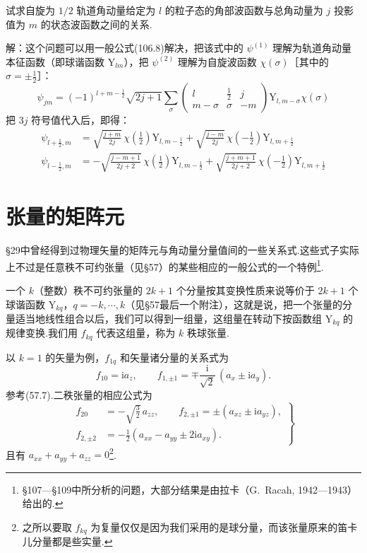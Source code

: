\begin{xiti}

\quad 试求自旋为 $1/2$ 轨道角动量给定为 $l$ 的粒子态的角部波函数与总角动量为 $j$ 投影值为 $m$ 的状态波函数之间的关系.

解：这个问题可以用一般公式(106.8)解决，把该式中的 $\psi^{(1)}$ 理解为轨道角动量本征函数（即球谐函数 $\mathrm{Y}_{lm}$），把 $\psi^{(2)}$ 理解为自旋波函数 $\chi(\sigma)$［其中的 $\sigma=\pm\frac12$］：
\begin{equation*}
  \psi_{jm}=(-1)^{l+m-\frac12}\sqrt{2j+1}\sum_\sigma
  \left(\begin{array}{ccc}l&\tfrac12&j\\m-\sigma&\sigma&-m\end{array}\right)
  \mathrm{Y}_{l,m-\sigma}\chi(\sigma)
\end{equation*}
把 $3j$ 符号值代入后，即得：
\begin{equation*}
\begin{aligned}
  \psi_{l+\frac12,m}&=\sqrt{\frac{j+m}{2j}}\,
  \chi\left(\tfrac12\right)\mathrm{Y}_{l,m-\frac12}
  +\sqrt{\frac{j-m}{2j}}\,
  \chi\left(-\tfrac12\right)\mathrm{Y}_{l,m+\frac12}\\
  \psi_{l-\frac12,m}&=-\sqrt{\frac{j-m+1}{2j+2}}\,
  \chi\left(\tfrac12\right)\mathrm{Y}_{l,m-\frac12}
  +\sqrt{\frac{j+m+1}{2j+2}}\,
  \chi\left(-\tfrac12\right)\mathrm{Y}_{l,m+\frac12}
\end{aligned}
\end{equation*}

\end{xiti}

\section{张量的矩阵元}

§29中曾经得到过物理矢量的矩阵元与角动量分量值间的一些关系式.这些式子实际上不过是任意秩不可约张量（见§57）的某些相应的一般公式的一个特例\footnote{§107—§109中所分析的问题，大部分结果是由拉卡（G.~Racah, 1942—1943）给出的.}.

一个 $k$（整数）秩不可约张量的 $2k+1$ 个分量按其变换性质来说等价于 $2k+1$ 个球谐函数 $\mathrm{Y}_{kq}$，$q=-k,\cdots,k$（见§57最后一个附注），这就是说，把一个张量的分量适当地线性组合以后，我们可以得到一组量，这组量在转动下按函数组 $\mathrm{Y}_{kq}$ 的规律变换.我们用 $f_{kq}$ 代表这组量，称为 $k$ 秩球张量.

以 $k=1$ 的矢量为例，$f_{1q}$ 和矢量诸分量的关系式为
\begin{equation}
  f_{10}=\mathrm{i}a_z,\qquad
  f_{1,\pm1}=\mp\frac{\mathrm{i}}{\sqrt{2}}\,(a_x\pm\mathrm{i}a_y).
\end{equation}
参考(57.7).二秩张量的相应公式为
\begin{equation}
\left.\begin{aligned}
  f_{20}&=-\sqrt{\tfrac32}\,a_{zz},\qquad
  f_{2,\pm1}=\pm(a_{xz}\pm\mathrm{i}a_{yz}),\\
  f_{2,\pm2}&=-\tfrac12(a_{xx}-a_{yy}\pm2\mathrm{i}a_{xy}).
\end{aligned}\right\}
\end{equation}
且有 $a_{xx}+a_{yy}+a_{zz}=0$\footnote{之所以要取 $f_{kq}$ 为复量仅仅是因为我们采用的是球分量，而该张量原来的笛卡儿分量都是些实量.}.

